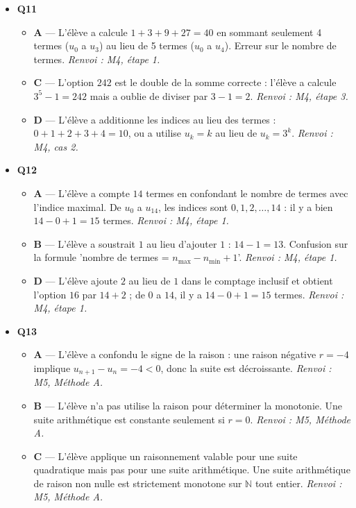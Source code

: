 \begin{itemize}
\begin{itemize}
    \item \textbf{D} — L'élève a calcule $20 \times 21 = 420$ en oubliant de diviser par $2$ dans la formule $n(n+1)/2$. \emph{Renvoi : M4, cas 1.}
  \end{itemize}
  \item \textbf{Q11}
  \begin{itemize}
    \item \textbf{A} — L'élève a calcule $1 + 3 + 9 + 27 = 40$ en sommant seulement 4 termes ($u_0$ a $u_3$) au lieu de 5 termes ($u_0$ a $u_4$). Erreur sur le nombre de termes. \emph{Renvoi : M4, étape 1.}
    \item \textbf{C} — L'option $242$ est le double de la somme correcte : l'élève a calcule $3^5-1=242$ mais a oublie de diviser par $3-1=2$. \emph{Renvoi : M4, étape 3.}
    \item \textbf{D} — L'élève a additionne les indices au lieu des termes : $0 + 1 + 2 + 3 + 4 = 10$, ou a utilise $u_k = k$ au lieu de $u_k = 3^k$. \emph{Renvoi : M4, cas 2.}
  \end{itemize}
  \item \textbf{Q12}
  \begin{itemize}
    \item \textbf{A} — L'élève a compte $14$ termes en confondant le nombre de termes avec l'indice maximal. De $u_0$ a $u_{14}$, les indices sont $0, 1, 2, \ldots, 14$ : il y a bien $14 - 0 + 1 = 15$ termes. \emph{Renvoi : M4, étape 1.}
    \item \textbf{B} — L'élève a soustrait $1$ au lieu d'ajouter $1$ : $14 - 1 = 13$. Confusion sur la formule 'nombre de termes = $n_{\max} - n_{\min} + 1$'. \emph{Renvoi : M4, étape 1.}
    \item \textbf{D} — L'élève ajoute $2$ au lieu de $1$ dans le comptage inclusif et obtient l'option $16$ par $14+2$ ; de $0$ a $14$, il y a $14-0+1=15$ termes. \emph{Renvoi : M4, étape 1.}
  \end{itemize}
  \item \textbf{Q13}
  \begin{itemize}
    \item \textbf{A} — L'élève a confondu le signe de la raison : une raison négative $r = -4$ implique $u_{n+1} - u_n = -4 < 0$, donc la suite est décroissante. \emph{Renvoi : M5, Méthode A.}
    \item \textbf{B} — L'élève n'a pas utilise la raison pour déterminer la monotonie. Une suite arithmétique est constante seulement si $r = 0$. \emph{Renvoi : M5, Méthode A.}
    \item \textbf{C} — L'élève applique un raisonnement valable pour une suite quadratique mais pas pour une suite arithmétique. Une suite arithmétique de raison non nulle est strictement monotone sur $\mathbb{N}$ tout entier. \emph{Renvoi : M5, Méthode A.}

\end{itemize}
\end{itemize}
